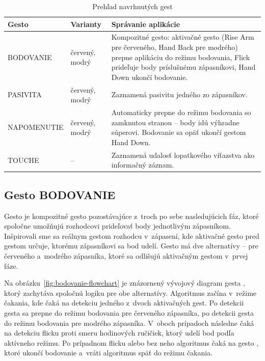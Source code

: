 \begin{table}[H]
  \centering
  \caption{Prehľad navrhnutých gest}
  \label{tab:prehlad-gest}
  \begin{tabularx}{\textwidth}{l l X}
    \toprule
    \textbf{Gesto} & \textbf{Varianty}
                   & \textbf{Správanie aplikácie}              \\
    \midrule
    BODOVANIE      & červený, modrý
                   & Kompozitné gesto: aktivačné gesto
    (Rise Arm pre červeného, Hand Back
    pre modrého) prepne aplikáciu do
    režimu bodovania, Flick prideľuje
    body príslušnému zápasníkovi, Hand
    Down ukončí bodovanie.                                     \\
    \addlinespace
    PASIVITA       & červený, modrý
                   & Zaznamená pasivitu jedného zo zápasníkov. \\
    \addlinespace
    NAPOMENUTIE    & červený, modrý
                   & Automaticky prepne do režimu
    bodovania so zamknutou stranou --
    body idú výhradne súperovi. Bodovanie
    sa opäť ukončí gestom Hand Down.                           \\
    \addlinespace
    TOUCHE & -- & Zaznamená udalosť lopatkového 
            víťazstva ako informačný záznam.                                                  \\
    \bottomrule
  \end{tabularx}
\end{table}

\subsection{Gesto BODOVANIE}

Gesto  je kompozitné gesto pozostávajúce z~troch po sebe nasledujúcich fáz, ktoré spoločne
umožňujú rozhodcovi prideľovať body jednotlivým zápasníkom. Inšpirovali sme sa reálnym gestom rozhodcu
v~zápasení, kde aktivačné gesto pred gestom  určuje, ktorému zápasníkovi sa bod udelí. Gesto má dve
alternatívy -- pre červeného a~modrého zápasníka, ktoré sa odlišujú aktivačným gestom v~prvej fáze.

Na obrázku~\ref{fig:bodovanie-flowchart} je znázornený vývojový diagram gesta , ktorý
zachytáva spoločnú logiku pre obe alternatívy. Algoritmus začína v~režime čakania, kde čaká na detekciu
jedného z~dvoch aktivačných gest. Po detekcii gesta  sa prepne do režimu bodovania pre
červeného zápasníka, po detekcii gesta  do režimu bodovania pre modrého zápasníka.
V~oboch prípadoch následne čaká na detekciu flicku proti smeru hodinových ručičiek, ktorý udelí bod
podľa aktívneho režimu. Po prípadnom flicku alebo bez neho algoritmus čaká na gesto ,
ktoré ukončí bodovanie a~vráti algoritmus späť do režimu čakania.

